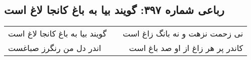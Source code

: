 \begin{center}
\section*{رباعی شماره ۳۹۷: گویند بیا به باغ کانجا لاغ است}
\label{sec:0397}
\begin{longtable}{l p{0.5cm} r}
گویند بیا به باغ کانجا لاغ است
&&
نی زحمت نزهت و نه بانگ زاغ است
\\
اندر دل من رنگرز صباغست
&&
کاندر پر هر زاغ از او صد باغ است
\\
\end{longtable}
\end{center}
